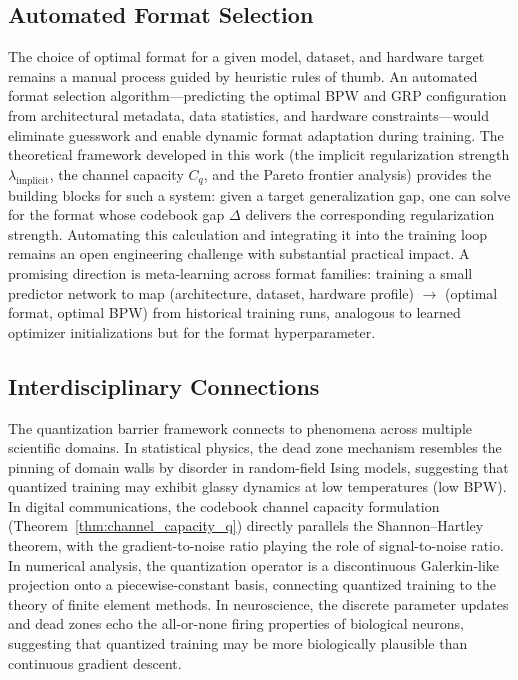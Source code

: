 \subsection{Automated Format Selection}

The choice of optimal format for a given model, dataset, and hardware target remains a manual process guided by heuristic rules of thumb. An automated format selection algorithm---predicting the optimal BPW and GRP configuration from architectural metadata, data statistics, and hardware constraints---would eliminate guesswork and enable dynamic format adaptation during training. The theoretical framework developed in this work (the implicit regularization strength $\lambda_{\text{implicit}}$, the channel capacity $C_q$, and the Pareto frontier analysis) provides the building blocks for such a system: given a target generalization gap, one can solve for the format whose codebook gap $\Delta$ delivers the corresponding regularization strength. Automating this calculation and integrating it into the training loop remains an open engineering challenge with substantial practical impact. A promising direction is meta-learning across format families: training a small predictor network to map (architecture, dataset, hardware profile) $\to$ (optimal format, optimal BPW) from historical training runs, analogous to learned optimizer initializations but for the format hyperparameter.

\subsection{Interdisciplinary Connections}

The quantization barrier framework connects to phenomena across multiple scientific domains. In statistical physics, the dead zone mechanism resembles the pinning of domain walls by disorder in random-field Ising models, suggesting that quantized training may exhibit glassy dynamics at low temperatures (low BPW). In digital communications, the codebook channel capacity formulation (Theorem~\ref{thm:channel_capacity_q}) directly parallels the Shannon--Hartley theorem, with the gradient-to-noise ratio playing the role of signal-to-noise ratio. In numerical analysis, the quantization operator is a discontinuous Galerkin-like projection onto a piecewise-constant basis, connecting quantized training to the theory of finite element methods. In neuroscience, the discrete parameter updates and dead zones echo the all-or-none firing properties of biological neurons, suggesting that quantized training may be more biologically plausible than continuous gradient descent.

